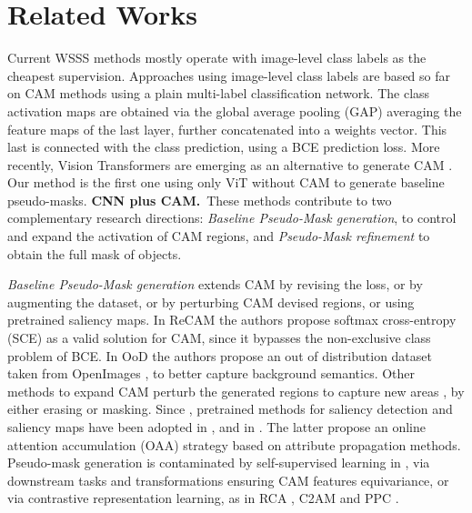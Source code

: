 \documentclass[runningheads]{styles/llncs}
\begin{document}
\section{Related Works}\label{sec:related}


Current WSSS methods mostly operate with image-level class labels as the cheapest supervision. Approaches using image-level class labels are based so far on CAM \cite{zhou2016learning} methods using a plain multi-label classification network. The class activation maps are obtained via the global average pooling (GAP) averaging the feature maps of the last layer, further concatenated into a weights vector. This last is connected with the class prediction, using a BCE prediction loss. More recently,  Vision Transformers \cite{dosovitskiy2021image}  are emerging as an alternative to generate CAM \cite{xu2022multi,ru2022learning}. Our method is the first one using only  ViT without CAM to generate baseline pseudo-masks. 
\baselineskip
\noindent
{\bf CNN plus CAM.}\  These methods contribute to two complementary research directions:  {\em Baseline Pseudo-Mask generation}, to control and expand the activation of CAM regions, and  {\em Pseudo-Mask refinement} to obtain the full mask of objects.   

\noindent
{\em Baseline Pseudo-Mask generation} extends  CAM by revising the loss, or by augmenting the dataset, or by perturbing CAM devised regions, or using pretrained saliency maps. In ReCAM \cite{chen2022class} the authors propose softmax cross-entropy (SCE)  as a valid solution for CAM, since it bypasses the non-exclusive class problem of BCE. In OoD \cite{lee2022weakly} the authors propose an out of distribution dataset taken from OpenImages \cite{kuznetsova2020open}, to better capture background semantics. Other methods to expand CAM perturb the generated regions to capture new areas \cite{kweon2021unlocking,stammes2021find,lee2021anti}, by either erasing or masking. 
Since \cite{wei2016stc}, pretrained methods for saliency detection and saliency maps have been adopted in \cite{oh2017exploiting,zhang2020splitting,Lee_2021_CVPR,yao2021non,wu2021embedded,xu2021leveraging}, and in \cite{jiang2019integral,jiang2021online}. The latter propose an online attention accumulation (OAA) strategy based on attribute propagation methods.  Pseudo-mask generation is contaminated by self-supervised learning in \cite{wang2020self},  via downstream tasks and transformations ensuring CAM features equivariance, or via contrastive representation learning, as in RCA \cite{zhou2022regional}, C2AM \cite{xie2022c2am} and PPC \cite{du2022weakly}.
\end{document}
